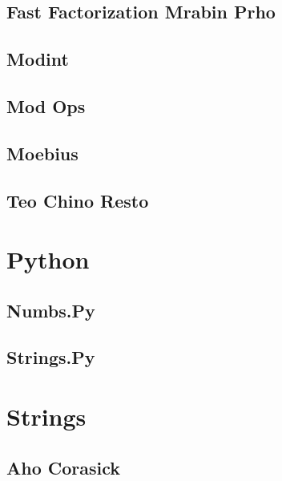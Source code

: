 \documentclass[10pt,landscape,twocolumn,a4paper,notitlepage]{article}
\newcommand\cppfile[2][]{

}
\newcommand\pythonfile[2][]{

}
\begin{document}
\subsection{Fast Factorization Mrabin Prho}
\cppfile{number_theory/fast_factorization_mrabin_prho.cpp}

\subsection{Modint}
\cppfile{number_theory/modint.cpp}

\subsection{Mod Ops}
\cppfile{number_theory/mod_ops.cpp}

\subsection{Moebius}
\cppfile{number_theory/moebius.cpp}

\subsection{Teo Chino Resto}
\cppfile{number_theory/teo_chino_resto.cpp}

\newpage


\section{Python}

\subsection{Numbs.Py}
\pythonfile{Python/numbs.py}

\subsection{Strings.Py}
\pythonfile{Python/strings.py}

\newpage


\section{Strings}

\subsection{Aho Corasick}
\cppfile{strings/aho_corasick.cpp}
\end{document}
